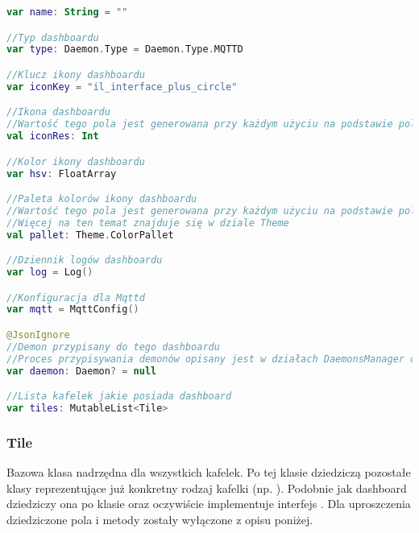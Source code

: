 \begin{lstlisting}[language=Kotlin]
var name: String = ""

//Typ dashboardu
var type: Daemon.Type = Daemon.Type.MQTTD

//Klucz ikony dashboardu
var iconKey = "il_interface_plus_circle"

//Ikona dashboardu
//Wartość tego pola jest generowana przy każdym użyciu na podstawie pola iconKey
val iconRes: Int

//Kolor ikony dashboardu
var hsv: FloatArray

//Paleta kolorów ikony dashboardu
//Wartość tego pola jest generowana przy każdym użyciu na podstawie pola hsv
//Więcej na ten temat znajduje się w dziale Theme
val pallet: Theme.ColorPallet

//Dziennik logów dashboardu
var log = Log()

//Konfiguracja dla Mqttd
var mqtt = MqttConfig()

@JsonIgnore
//Demon przypisany do tego dashboardu
//Proces przypisywania demonów opisany jest w działach DaemonsManager oraz Setup
var daemon: Daemon? = null

//Lista kafelek jakie posiada dashboard
var tiles: MutableList<Tile>
\end{lstlisting}

\newpage

\subsubsection{Tile}
Bazowa klasa nadrzędna dla wszystkich kafelek. Po tej klasie dziedziczą pozostałe klasy reprezentujące już konkretny rodzaj kafelki (np. ). Podobnie jak dashboard dziedziczy ona po klasie  oraz oczywiście implementuje interfejs .
Dla uproszczenia dziedziczone pola i metody zostały wyłączone z opisu poniżej.\\

